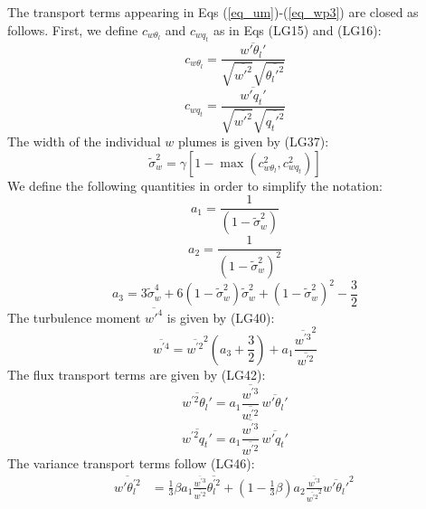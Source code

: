 \documentclass[11pt,fleqn]{article}
\begin{document}
The transport terms appearing in Eqs (\ref{eq_um})-(\ref{eq_wp3}) are
closed as follows. First, we define $c_{w\theta_l}$ and $c_{wq_t}$
as in Eqs (LG15) and (LG16):
%
\begin{equation}
\label{eq_cwthl}
c_{w\theta_l} 
= \frac{ \overline{w'\theta_l'} }
       { \sqrt{\overline{w'^2}}\sqrt{\overline{\theta_l'^2}} }
\end{equation}
%
\begin{equation}
\label{eq_cwqt}
c_{wq_t} 
= \frac{ \overline{w'q_t'} }
       { \sqrt{\overline{w'^2}}\sqrt{\overline{q_t'^2}} }
\end{equation}
%
The width of the individual $w$ plumes is given by (LG37):
%
\begin{equation}
\label{eq_sc}
\tilde{\sigma}^2_w 
= \gamma \left[ 1 - \max\left( c^2_{w\theta_l}, c^2_{wq_t} \right) \right]
\end{equation}
%
We define the following quantities in order to simplify the notation:
% 
\begin{equation}
\label{eq_a1}
a_1 = \frac{1}{ (1-\tilde{\sigma}_w^2) }
\end{equation}
%
\begin{equation}
\label{eq_a2}
a_2 = \frac{1}{ (1-\tilde{\sigma}_w^2)^2 }
\end{equation}
%
\begin{equation}
\label{eq_a3}
a_3 = 3 \tilde{\sigma}_w^4 
      + 6 ( 1 - \tilde{\sigma}_w^2 ) \tilde{\sigma}_w^2
      + ( 1 - \tilde{\sigma}_w^2 )^2 
      -\frac{3}{2}
\end{equation}
%
The turbulence moment $\overline{w'^4}$ is given by (LG40):
%
\begin{equation}
\label{eq_wp4}
\overline{w^{'4}}
= \overline{w^{'2}}^2
  \left( a_3 + \frac{3}{2} \right)
+ a_1 \frac{ \overline{w^{'3}}^2 }{ \overline{w^{'2}} }
\end{equation}
%
The flux transport terms are given by (LG42):
%
\begin{equation}
\label{eq_wp2thlp}
\overline{w^{'2}\theta_l'}
= a_1 \frac{\overline{w^{'3}}}{\overline{w^{'2}}} \,
  \overline{w'\theta_l'}
\end{equation}
%
\begin{equation}
\label{eq_wp2qtp}
\overline{w^{'2}q_t'}
= a_1 \frac{\overline{w^{'3}}}{\overline{w^{'2}}} \,
  \overline{w'q_t'}
\end{equation}
%
The variance transport terms follow (LG46):
%
\begin{equation}
\label{eq_wpthlp2}
\begin{split}
\overline{w'\theta_l^{'2}}
& = 
    \frac{1}{3} \beta
    a_1 \frac{\overline{w^{'3}}}{\overline{w^{'2}}} \overline{\theta_l^{'2}}
  + \left( 1 - \frac{1}{3}\beta \right)
    a_2 \frac{\overline{w^{'3}}}{\overline{w^{'2}}^2} \overline{w'\theta_l'}^2 \,
\end{split}
\end{equation}
\end{document}
